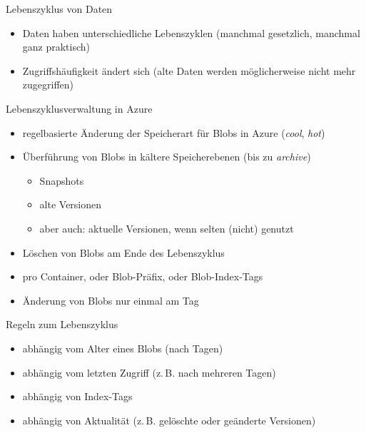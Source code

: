 
\begin{flashcard}[Definition]{Lebenszyklus von Daten}
  \begin{itemize}
    \item Daten haben unterschiedliche Lebenszyklen (manchmal gesetzlich, manchmal ganz praktisch)
    \item Zugriffshäufigkeit ändert sich (alte Daten werden möglicherweise nicht mehr zugegriffen)
  \end{itemize}
\end{flashcard}

\begin{flashcard}[Definition]{Lebenszyklusverwaltung in Azure}
  \begin{itemize}
    \item regelbasierte Änderung der Speicherart für Blobs in Azure (\emph{cool}, \emph{hot})
    \item Überführung von Blobs in kältere Speicherebenen (bis zu \emph{archive})
      \begin{itemize}
        \item Snapshots
        \item alte Versionen
        \item aber auch: aktuelle Versionen, wenn selten (nicht) genutzt
      \end{itemize}
     \item Löschen von Blobs am Ende des Lebenszyklus
     \item pro Container, oder Blob-Präfix, oder Blob-Index-Tags
     \item Änderung von Blobs nur einmal am Tag
  \end{itemize}
\end{flashcard}

\begin{flashcard}[Definition]{Regeln zum Lebenszyklus}
  \begin{itemize}
    \item abhängig vom Alter eines Blobs (nach Tagen)
    \item abhängig vom letzten Zugriff (z.\,B. nach mehreren Tagen)
    \item abhängig von Index-Tags
    \item abhängig von Aktualität (z.\,B. gelöschte oder geänderte Versionen)
  \end{itemize}
\end{flashcard}
